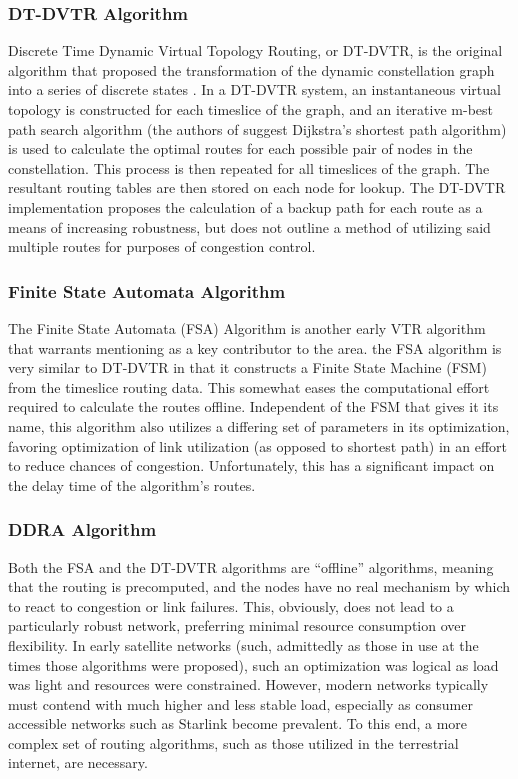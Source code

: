 \subsubsection{DT-DVTR Algorithm}\label{subsubsec:dt-dvtr}
Discrete Time Dynamic Virtual Topology Routing, or DT-DVTR, is the original algorithm that proposed the transformation of the dynamic constellation graph into a series of discrete states \cite{werner_dynamic_1997}. In a DT-DVTR system, an instantaneous virtual topology is constructed for each timeslice of the graph, and an iterative m-best path search algorithm (the authors of \cite{werner_dynamic_1997} suggest Dijkstra's shortest path algorithm) is used to calculate the optimal routes for each possible pair of nodes in the constellation. This process is then repeated for all timeslices of the graph. The resultant routing tables are then stored on each node for lookup. The DT-DVTR implementation proposes the calculation of a backup path for each route as a means of increasing robustness, but does not outline a method of utilizing said multiple routes for purposes of congestion control.

\subsubsection{Finite State Automata Algorithm}\label{subsubsec:fsa}
The Finite State Automata (FSA) Algorithm is another early VTR algorithm that warrants mentioning as a key contributor to the area. the FSA algorithm is very similar to DT-DVTR in that it constructs a Finite State Machine (FSM) from the timeslice routing data. This somewhat eases the computational effort required to calculate the routes offline. Independent of the FSM that gives it its name, this algorithm also utilizes a differing set of parameters in its optimization, favoring optimization of link utilization (as opposed to shortest path) in an effort to reduce chances of congestion. Unfortunately, this has a significant impact on the delay time of the algorithm's routes.

\subsubsection {DDRA Algorithm}\label{subsubsec:ddra}
Both the FSA and the DT-DVTR algorithms are ``offline'' algorithms, meaning that the routing is precomputed, and the nodes have no real mechanism by which to react to congestion or link failures. This, obviously, does not lead to a particularly robust network, preferring minimal resource consumption over flexibility. In early satellite networks (such, admittedly as those in use at the times those algorithms were proposed), such an optimization was logical as load was light and resources were constrained. However, modern networks typically must contend with much higher and less stable load, especially as consumer accessible networks such as Starlink become prevalent. To this end, a more complex set of routing algorithms, such as those utilized in the terrestrial internet, are necessary.

